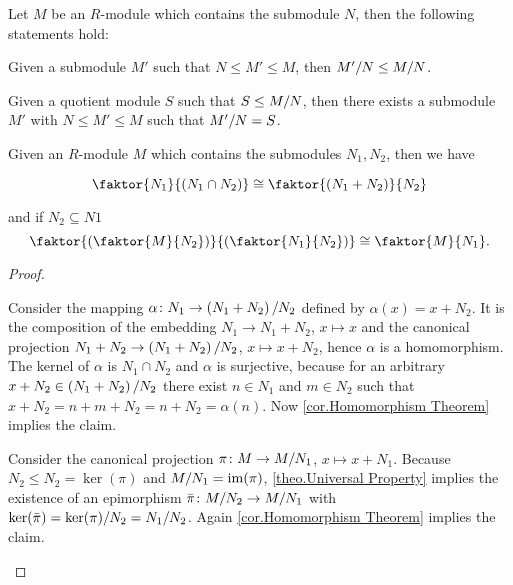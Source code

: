 \begin{cor}
Let $M$ be an $R$-module which contains the submodule $N$, then the following statements hold:
\begin{thmlist}
\item Given a submodule $M'$ such that $N\leq M'\leq M$, then $\nicefrac{M'}{N}\leq\MtN$.
\item Given a quotient module $S$ such that $S\leq\MtN$, then there exists a submodule $M'$ with $N\leq M'\leq M$ such that $\nicefrac{M'}{N}=S$.
\end{thmlist}
\end{cor}

\begin{cor}
Given an $R$-module $M$ which contains the submodules $N_1,N_2$, then we have
\begin{thmlist}
\item $$\faktor{N_1}{\left(N_1\cap N_2\right)}\cong\faktor{\left(N_1+N_2\right)}{N_2}$$
\item and if $N_2\subseteq N1$ $$\faktor{\left(\faktor{M}{N_2}\right)}{\left(\faktor{N_1}{N_2}\right)}\cong\faktor{M}{N_1}.$$
\end{thmlist}
\end{cor}
\begin{proof}
\begin{plist}
\item Consider the mapping $\alpha\colon N_1\to \nicefrac{\left(N_1+N_2\right)}{N_2}$ def\-ined by $\alpha(x)=x+N_2$. It is the composition of the embedding $N_1\to N_1+N_2$, $x\mapsto x$ and the canonical projection $N_1+N_2\to\nicefrac{\left(N_1+N_2\right)}{N_2}$, $x\mapsto x+N_2$, hence $\alpha$ is a homomorphism. The kernel of $\alpha$ is $N_1\cap N_2$ and $\alpha$ is surjective, because for an arbitrary $x+N_2\in\nicefrac{\left(N_1+N_2\right)}{N_2}$ there exist $n\in N_1$ and $m\in N_2$ such that $x+N_2=n+m+N_2=n+N_2=\alpha(n)$. Now \cref{cor.Homomorphism Theorem} implies the claim. 
\item Consider the canonical projection $\pi\colon M\to \nicefrac{M}{N_1}$, $x\mapsto x+N_1$. Because $N_2\leq N_2=\ker(\pi)$ and $\nicefrac{M}{N_1}=\im(\pi)$, \cref{theo.Universal Property} implies the existence of an epimorphism $\bar{\pi}\colon \nicefrac{M}{N_2}\to\nicefrac{M}{N_1}$ with $\ker(\bar{\pi})=\nicefrac{\ker(\pi)}{N_2}=\nicefrac{N_1}{N_2}$. Again \cref{cor.Homomorphism Theorem} implies the claim.
\end{plist}
\end{proof}